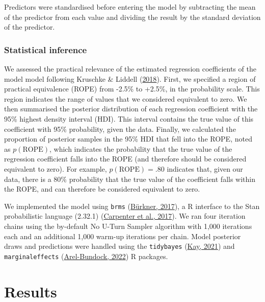 \documentclass[
]{article}
\begin{document}
Predictors were standardised before entering the model by subtracting
the mean of the predictor from each value and dividing the result by the
standard deviation of the predictor.

\hypertarget{statistical-inference}{%
\subsubsection{Statistical inference}\label{statistical-inference}}

We assessed the practical relevance of the estimated regression
coefficients of the model model following Kruschke \& Liddell
(\protect\hyperlink{ref-kruschke2018bayesian}{2018}). First, we
specified a region of practical equivalence (ROPE) from -2.5\% to
+2.5\%, in the probability scale. This region indicates the range of
values that we considered equivalent to zero. We then summarised the
posterior distribution of each regression coefficient with the 95\%
highest density interval (HDI). This interval contains the true value of
this coefficient with 95\% probability, given the data. Finally, we
calculated the proportion of posterior samples in the 95\% HDI that fell
into the ROPE, noted as \(p(\text{ROPE})\), which indicates the
probability that the true value of the regression coefficient falls into
the ROPE (and therefore should be considered equivalent to zero). For
example, \(p(\text{ROPE})=.80\) indicates that, given our data, there is
a 80\% probability that the true value of the coefficient falls within
the ROPE, and can therefore be considered equivalent to zero.

We implemented the model using \texttt{brms}
(\protect\hyperlink{ref-burkner2017brms}{Bürkner, 2017}), a R interface
to the Stan probabilistic language (2.32.1)
(\protect\hyperlink{ref-carpenter2017stan}{Carpenter et al., 2017}). We
ran four iteration chains using the by-default No U-Turn Sampler
algorithm with 1,000 iterations each and an additional 1,000 warm-up
iterations per chain. Model posterior draws and predictions were handled
using the \texttt{tidybayes}
(\protect\hyperlink{ref-kay2021tidybayes}{Kay, 2021}) and
\texttt{marginaleffects}
(\protect\hyperlink{ref-arel-bundock2022marginaleffects}{Arel-Bundock,
2022}) R packages.

\hypertarget{sec-results}{%
\section{Results}\label{sec-results}}
\end{document}
